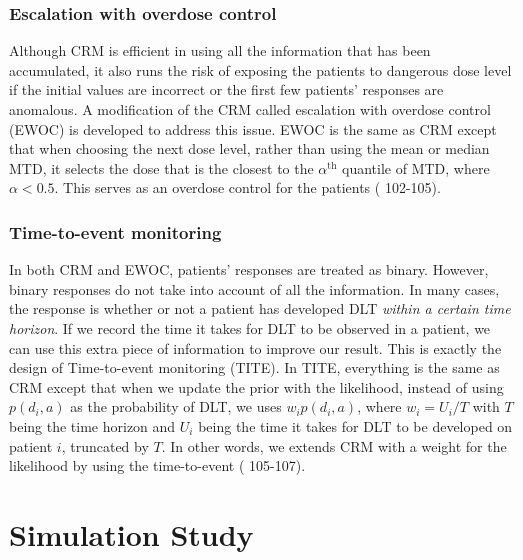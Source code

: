 \documentclass[12pt]{article}
\begin{document}
\subsubsection{Escalation with overdose control}

Although CRM is efficient in using all the information that has been accumulated, it also runs the risk of exposing the patients to dangerous dose level if the initial values are incorrect or the first few patients' responses are anomalous.
A modification of the CRM called escalation with overdose control (EWOC) is developed to address this issue.
EWOC is the same as CRM except that when choosing the next dose level, rather than using the mean or median MTD, it selects the dose that is the closest to the $\alpha^{\text{th}}$ quantile of MTD, where $\alpha < 0.5$.
This serves as an overdose control for the patients (\cite{berry} 102-105).

\subsubsection{Time-to-event monitoring}

In both CRM and EWOC, patients' responses are treated as binary.
However, binary responses do not take into account of all the information.
In many cases, the response is whether or not a patient has developed DLT {\it within a certain time horizon}.
If we record the time it takes for DLT to be observed in a patient,
we can use this extra piece of information to improve our result.
This is exactly the design of Time-to-event monitoring (TITE).
In TITE, everything is the same as CRM except that when we update the prior with the likelihood, instead of using $p(d_i, a)$ as the probability of DLT, we uses $w_i p(d_i, a)$, where $w_i = U_i / T$ with $T$ being the time horizon and $U_i$ being the time it takes for DLT to be developed on patient $i$, truncated by $T$.
In other words, we extends CRM with a weight for the likelihood by using the time-to-event (\cite{berry} 105-107).




\section{Simulation Study} \label{secSim}
\end{document}
